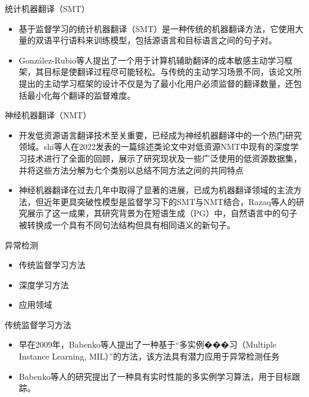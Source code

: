\documentclass[UTF8,AutoFakeBold,AutoFakeSlant]{beamer}
\begin{document}
\begin{frame}{统计机器翻译（SMT）}
    \begin{itemize}
        \item 基于监督学习的统计机器翻译（SMT）是一种传统的机器翻译方法，它使用大量的双语平行语料来训练模型，包括源语言和目标语言之间的句子对。
        \item González-Rubio等人提出了一个用于计算机辅助翻译的成本敏感主动学习框架，其目标是使翻译过程尽可能轻松。与传统的主动学习场景不同，该论文所提出的主动学习框架的设计不仅是为了最小化用户必须监督的翻译数量，还包括最小化每个翻译的监督难度。
    \end{itemize}
\end{frame}

\begin{frame}{神经机器翻译（NMT）}
    \scriptsize
    \begin{itemize}
        \item 开发低资源语言翻译技术至关重要，已经成为神经机器翻译中的一个热门研究领域。shi等人在2022发表的一篇综述类论文中对低资源NMT中现有的深度学习技术进行了全面的回顾，展示了研究现状及一些广泛使用的低资源数据集，并将这些方法分解为七个类别以总结不同方法之间的共同特点
        \item 神经机器翻译在过去几年中取得了显著的进展，已成为机器翻译领域的主流方法，但近年更具突破性模型是监督学习下的SMT与NMT结合，Razaq等人的研究展示了这一成果，其研究背景为在短语生成（PG）中，自然语言中的句子被转换成一个具有不同句法结构但具有相同语义的新句子。
    \end{itemize}
\end{frame}

\begin{frame}{异常检测}
    \begin{itemize}
        \item 传统监督学习方法
        \item 深度学习方法
        \item 应用领域
    \end{itemize}
\end{frame}

\begin{frame}{传统监督学习方法}
    \begin{itemize}
        \item 早在2009年，Babenko等人提出了一种基于“多实例���习（Multiple Instance Learning, MIL）”的方法，该方法具有潜力应用于异常检测任务
        \item Babenko等人的研究提出了一种具有实时性能的多实例学习算法，用于目标跟踪。
    \end{itemize}
\end{frame}
\end{document}
